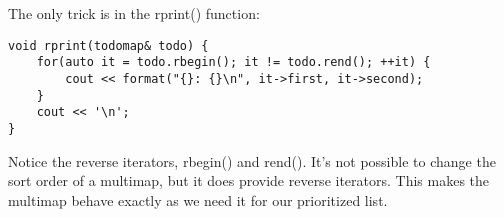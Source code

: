 The only trick is in the rprint() function:

\begin{lstlisting}[style=styleCXX]
void rprint(todomap& todo) {
	for(auto it = todo.rbegin(); it != todo.rend(); ++it) {
		cout << format("{}: {}\n", it->first, it->second);
	}
	cout << '\n';
}
\end{lstlisting}

Notice the reverse iterators, rbegin() and rend(). It's not possible to change the sort order of a multimap, but it does provide reverse iterators. This makes the multimap behave exactly as we need it for our prioritized list.





